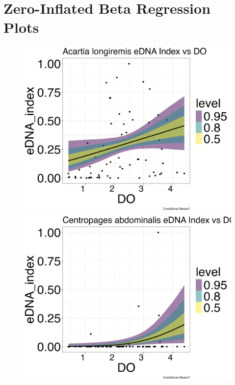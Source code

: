\documentclass[12pt,twoside]{reedthesis}
\begin{document}
{%
    \chapter{Zero-Inflated Beta Regression Plots}\label{chap:appZOIB}

	\begin{figure}[h]
		\begin{center}
			\includegraphics[scale=0.25]{Alongiremis_ZOIB_Means_noOut}
			\includegraphics[scale=0.25]{Cabdominalis_ZOIB_Means_noOut}

\end{center}
\end{figure}}
\end{document}
